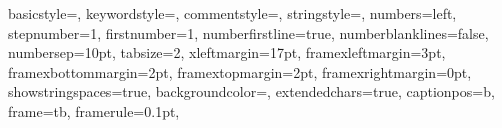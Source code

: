 \documentclass[12pt,apalike,a4paper,openright,oneside,makeidx]{memoir}
\begin{document}
\frontmatter






{
basicstyle={\footnotesize},
keywordstyle=\color[rgb]{0,0,1}, 
commentstyle=\color[rgb]{0.133,0.545,0.133}, 
stringstyle=\color[rgb]{0.627,0.126,0.941}, 
numbers=left, 
stepnumber=1, 
firstnumber=1,
numberfirstline=true,
numberblanklines=false, 
numbersep=10pt, 
tabsize=2,
xleftmargin=17pt,
framexleftmargin=3pt,
framexbottommargin=2pt,
framextopmargin=2pt,
framexrightmargin=0pt,
showstringspaces=true,
backgroundcolor={\color{ListingBackground}},
extendedchars=true,
captionpos=b,
frame=tb,
framerule=0.1pt, 
}







\mainmatter










\nocite{*}

{\small}

%

\backmatter

\end{document}
